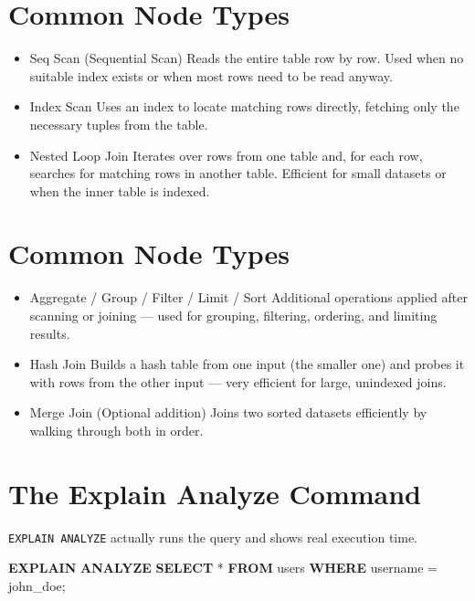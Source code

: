 \documentclass[
]{report}
\newenvironment{Shaded}{\begin{snugshade}}{\end{snugshade}}
\newcommand{\KeywordTok}[1]{\textcolor[rgb]{0.00,0.23,0.31}{\textbf{#1}}}
\newcommand{\NormalTok}[1]{\textcolor[rgb]{0.00,0.23,0.31}{#1}}
\newcommand{\OperatorTok}[1]{\textcolor[rgb]{0.37,0.37,0.37}{#1}}
\newcommand{\StringTok}[1]{\textcolor[rgb]{0.13,0.47,0.30}{#1}}
\begin{document}
\section{Common Node Types}\label{common-node-types}

\begin{itemize}
\item
  Seq Scan (Sequential Scan) Reads the entire table row by row. Used
  when no suitable index exists or when most rows need to be read
  anyway.
\item
  Index Scan Uses an index to locate matching rows directly, fetching
  only the necessary tuples from the table.
\item
  Nested Loop Join Iterates over rows from one table and, for each row,
  searches for matching rows in another table. Efficient for small
  datasets or when the inner table is indexed.
\end{itemize}

\section{Common Node Types}\label{common-node-types-1}

\begin{itemize}
\item
  Aggregate / Group / Filter / Limit / Sort Additional operations
  applied after scanning or joining --- used for grouping, filtering,
  ordering, and limiting results.
\item
  Hash Join Builds a hash table from one input (the smaller one) and
  probes it with rows from the other input --- very efficient for large,
  unindexed joins.
\item
  Merge Join (Optional addition) Joins two sorted datasets efficiently
  by walking through both in order.
\end{itemize}

\section{The Explain Analyze Command}\label{the-explain-analyze-command}

\texttt{EXPLAIN\ ANALYZE} actually runs the query and shows real
execution time.

\begin{Shaded}
\begin{Highlighting}[]
\KeywordTok{EXPLAIN} \KeywordTok{ANALYZE}
\KeywordTok{SELECT} \OperatorTok{*} \KeywordTok{FROM}\NormalTok{ users }\KeywordTok{WHERE}\NormalTok{ username }\OperatorTok{=} \StringTok{\textquotesingle{}john\_doe\textquotesingle{}}\NormalTok{;}
\end{Highlighting}
\end{Shaded}
\end{document}
